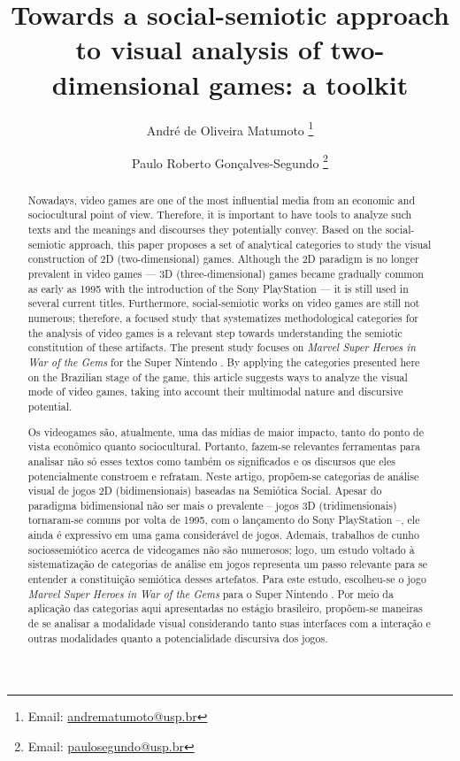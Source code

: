 \documentclass[english]{textolivre}
\title{Towards a social-semiotic approach to visual analysis of two-dimensional games: a toolkit}
\author[1]{André de Oliveira Matumoto \orcid{0000-0003-3544-3576} \thanks{Email: \href{mailto:andrematumoto@usp.br}{andrematumoto@usp.br}}}
\author[1]{Paulo Roberto Gonçalves-Segundo \orcid{0000-0002-5592-8098} \thanks{Email: \href{mailto:paulosegundo@usp.br}{paulosegundo@usp.br}}}
\affil[1]{Universidade de São Paulo, Faculdade de Filosofia, Letras e Ciências Humanas, Departamento de Letras Clássicas e Vernáculas, SP Brasil.}
\begin{document}
\maketitle

\begin{polyabstract}
\begin{abstract}
Nowadays, video games are one of the most influential media from an economic and sociocultural point of view. Therefore, it is important to have tools to analyze such texts and the meanings and discourses they potentially convey. Based on the social-semiotic approach, this paper proposes a set of analytical categories to study the visual construction of 2D (two-dimensional) games. Although the 2D paradigm is no longer prevalent in video games — 3D (three-dimensional) games became gradually common as early as 1995 with the introduction of the Sony PlayStation — it is still used in several current titles. Furthermore, social-semiotic works on video games are still not numerous; therefore, a focused study that systematizes methodological categories for the analysis of video games is a relevant step towards understanding the semiotic constitution of these artifacts. The present study focuses on \textit{Marvel Super Heroes in War of the Gems} for the Super Nintendo \cite{capcom_marvel_1996}. By applying the categories presented here on the Brazilian stage of the game, this article suggests ways to analyze the visual mode of video games, taking into account their multimodal nature and discursive potential.

\end{abstract}

\begin{portuguese}
\begin{abstract}
Os videogames são, atualmente, uma das mídias de maior impacto, tanto do ponto de vista econômico quanto sociocultural. Portanto, fazem-se relevantes ferramentas para analisar não só esses textos como também os significados e os discursos que eles potencialmente constroem e refratam. Neste artigo, propõem-se categorias de análise visual de jogos 2D (bidimensionais) baseadas na Semiótica Social. Apesar do paradigma bidimensional não ser mais o prevalente – jogos 3D (tridimensionais) tornaram-se comuns por volta de 1995, com o lançamento do Sony PlayStation –, ele ainda é expressivo em uma gama considerável de jogos. Ademais, trabalhos de cunho sociossemiótico acerca de videogames não são numerosos; logo, um estudo voltado à sistematização de categorias de análise em jogos representa um passo relevante para se entender a constituição semiótica desses artefatos. Para este estudo, escolheu-se o jogo \textit{Marvel Super Heroes in War of the Gems} para o Super Nintendo \cite{capcom_marvel_1996}. Por meio da aplicação das categorias aqui apresentadas no estágio brasileiro, propõem-se maneiras de se analisar a modalidade visual considerando tanto suas interfaces com a interação e outras modalidades quanto a potencialidade discursiva dos jogos.


\end{abstract}
\end{portuguese}
\end{polyabstract}
\end{document}
